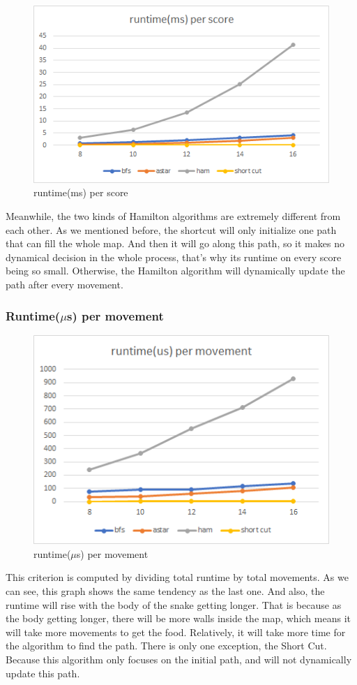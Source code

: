 \documentclass[12pt]{article}
\begin{document}
\begin{figure}[H]
    \centering 
    \includegraphics[scale = 0.9]{anay2.png}
    \caption{runtime(ms) per score}
\end{figure}

Meanwhile, the two kinds of Hamilton algorithms are extremely different from each other. As we mentioned before, the shortcut will only initialize one path that can fill the whole map. And then it will go along this path, so it makes no dynamical decision in the whole process, that's why its runtime on every score being so small. Otherwise, the Hamilton algorithm will dynamically update the path after every movement. 

\subsubsection{Runtime($\mu$s) per movement}



\begin{figure}[H]
    \centering 
    \includegraphics[scale = 0.9]{anay3.png}
    \caption{runtime($\mu$s) per movement}
\end{figure}

This criterion is computed by dividing total runtime by total movements. As we can see, this graph shows the same tendency as the last one. And also, the runtime will rise with the body of the snake getting longer. That is because as the body getting longer, there will be more walls inside the map, which means it will take more movements to get the food. Relatively, it will take more time for the algorithm to find the path. There is only one exception, the Short Cut. Because this algorithm only focuses on the initial path, and will not dynamically update this path. 
\end{document}
